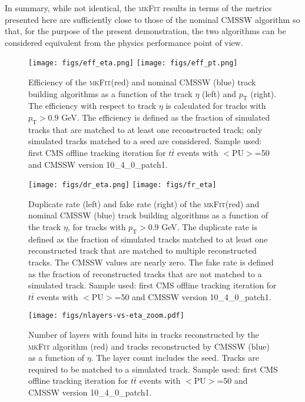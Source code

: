 \documentclass[a4paper,11pt]{article}
\newcommand{\ttbar}{\ensuremath{t\bar{t}}\xspace}
\newcommand{\mkFit}{\textsc{mkFit}\xspace}
\begin{document}
In summary, while not identical, the \mkFit results in terms of the metrics presented here are sufficiently close to those of the nominal CMSSW algorithm so that, for the purpose of the present demonstration, the two algorithms can be considered equivalent from the physics performance point of view.

\begin{figure}[!htb]
  \centering
  \texttt{[image: figs/eff\_eta.png]}
  \texttt{[image: figs/eff\_pt.png]}
  \caption{Efficiency of the \mkFit (red) and nominal CMSSW (blue) track building algorithms as a function of the track $\eta$ (left) and $p_\mathrm{T}$ (right). The efficiency with respect to track $\eta$ is calculated for tracks with $p_\mathrm{T} > 0.9$ GeV. The efficiency is defined as the fraction of simulated tracks that are matched to at least one reconstructed track; only simulated tracks matched to a seed are considered. Sample used: first CMS offline tracking iteration for \ttbar events with $<$PU$>$=50 and CMSSW version 10\_4\_0\_patch1.}
    \label{fig:eff}
\end{figure}



\begin{figure}[!htb]
  \centering
  \texttt{[image: figs/dr\_eta.png]}
  \texttt{[image: figs/fr\_eta]}
  \caption{Duplicate rate (left) and fake rate (right) of the \mkFit (red) and nominal CMSSW (blue) track building algorithms as a function of the track $\eta$, for tracks with $p_\mathrm{T} > 0.9$ GeV. The duplicate rate is defined as the fraction of simulated tracks matched to at least one reconstructed track that are matched to multiple reconstructed tracks. The CMSSW values are nearly zero. The fake rate is defined as the fraction of reconstructed tracks that are not matched to a simulated track. Sample used: first CMS offline tracking iteration for \ttbar events with $<$PU$>$=50 and CMSSW version 10\_4\_0\_patch1.}
  \label{fig:dr}
\end{figure}


\begin{figure}[!htb]
  \centering
  \texttt{[image: figs/nlayers-vs-eta\_zoom.pdf]}
  \caption{Number of layers with found hits in tracks reconstructed by the \mkFit algorithm (red) and tracks reconstructed by CMSSW (blue) as a function of $\eta$. The layer count includes the seed. Tracks are required to be matched to a simulated track. Sample used: first CMS offline tracking iteration for \ttbar events with $<$PU$>$=50 and CMSSW version 10\_4\_0\_patch1.}
  \label{fig:nLayers}
\end{figure}
\end{document}
